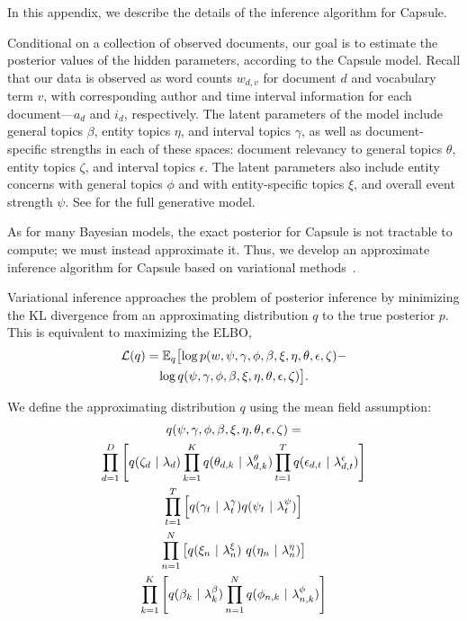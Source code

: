 
In this appendix, we describe the details of the inference algorithm for Capsule.

Conditional on a collection of observed documents, our goal is to estimate the posterior values of the hidden parameters, according to the Capsule model.   Recall that our data is observed as word counts $w_{d,v}$ for document $d$ and vocabulary term $v$, with corresponding author and time interval information for each document---$a_d$ and $i_d$, respectively.
The latent parameters of the model include general topics $\beta$, entity topics $\eta$, and interval topics $\gamma$, as well as document-specific strengths in each of these spaces: document relevancy to general topics $\theta$, entity topics $\zeta$, and interval topics $\epsilon$.  The latent parameters also include entity concerns with general topics $\phi$ and with entity-specific topics $\xi$, and overall event strength $\psi$.  See  for the full generative model.

As for many Bayesian models, the exact posterior for Capsule is not tractable to compute; we must instead approximate it.  Thus, we develop an approximate inference algorithm for Capsule based on variational methods~\cite{Jordan:1999,Wainwright:2008}.

Variational inference approaches the problem of posterior inference by minimizing the KL divergence from an approximating distribution $q$ to the true posterior $p$.
This is equivalent to maximizing the ELBO,
\begin{multline}
	\mathcal{L}(q)  = \mathbb{E}_{q}\bigl[\log p(w, \psi, \gamma, \phi, \beta, \xi, \eta, \theta, \epsilon, \zeta) 
	-\\ \log q(\psi, \gamma, \phi, \beta, \xi, \eta, \theta, \epsilon, \zeta)\bigr].
	\label{eq:cables:elbo}
\end{multline}


We define the approximating distribution $q$ using the mean field assumption:
\begin{multline}
	q(\psi, \gamma, \phi, \beta, \xi, \eta, \theta, \epsilon, \zeta) = \\
	 	\prod_{d=1}^D \left[q(\zeta_d ~\vert~ \lambda_d)
				\prod_{k=1}^K q(\theta_{d,k} ~\vert~ \lambda^\theta_{d,k})
				\prod_{t=1}^T q(\epsilon_{d,t} ~\vert~ \lambda^\epsilon_{d,t})
			\right] \\
		\prod_{t=1}^T \left[ q(\gamma_{t} ~\vert~ \lambda^\gamma_t) q(\psi_t ~\vert~ \lambda^\psi_t) \right] \\
		\prod_{n=1}^N \left[ q(\xi_{n} ~\vert~ \lambda^\xi_{n})~q(\eta_n ~\vert~ \lambda^{\eta}_{n}) \right] \\
		\prod_{k=1}^K \left[ q(\beta_{k} ~\vert~ \lambda^\beta_k) \prod_{n=1}^N q(\phi_{n,k} ~\vert~ \lambda^\phi_{n,k}) \right]
	\label{eq:q}
\end{multline}

